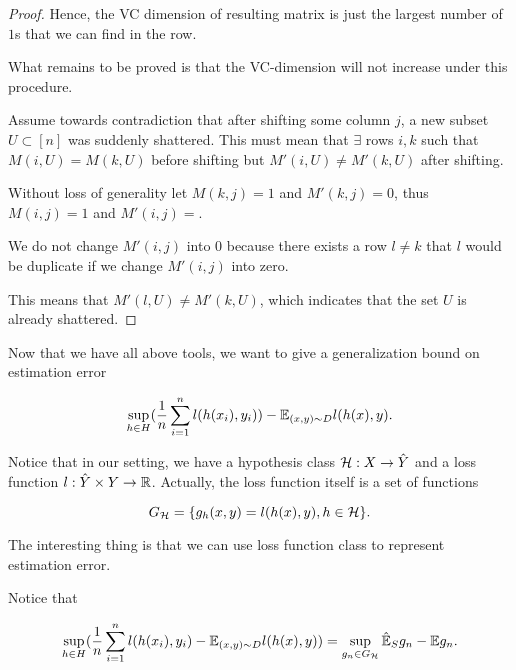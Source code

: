 \documentclass[../main.tex]{subfiles}
\begin{document}
\begin{proof}
		Hence, the VC dimension of resulting matrix is just the largest number of $1$s that we can find in the row.
		
		What remains to be proved is that the VC-dimension will not increase under this procedure.
		
		Assume towards contradiction that after shifting some column $j$, a new subset $U\subset [n]$ was suddenly shattered. This must mean that $\exists$ rows $i,k$ such that $M(i,U) = M(k,U)$ before shifting but $M'(i,U) \neq M'(k,U)$ after shifting.
		
		Without loss of generality let $M(k,j) = 1$ and $M'(k,j) = 0$, thus $M(i,j) = 1$ and $M'(i,j) = $.
		
		We do not change $M'(i,j)$ into $0$ because there exists a row $l\neq k$ that $l$ would be duplicate if we change $M'(i,j)$ into zero. 
		
		This means that $M'(l, U) \neq M'(k,U)$, which indicates that the set $U$ is already shattered.
		

		\end{proof}
		
		 Now that we have all above tools, we want to give a generalization bound on estimation error 
		 
		 \begin{equation*}
		 		 \sup\limits_{h\in H}(\frac{1}{n} \sum\limits_{i=1}^n l(h(x_i),y_i)) - \mathbb{E}_{(x,y)\sim D} l(h(x),y).
		 \end{equation*}
		 
		 Notice that in our setting, we have a hypothesis class $\mathcal{H}: X \to \hat{Y}$ and a loss function $l: \hat{Y} \times Y \to \mathbb{R}$. Actually, the loss function itself is a set of functions 
		 
		 \begin{equation*}
		 	G_{\mathcal{H}} = \{g_h(x,y) = l(h(x),y), h\in \mathcal{H}\}.
		 \end{equation*}
		
		 The interesting thing is that we can use loss function class to represent estimation error.
		 
		 Notice that 
		 
		 \begin{equation*}
		 \begin{aligned}
		  \sup\limits_{h\in H}(\frac{1}{n} \sum\limits_{i=1}^n l(h(x_i),y_i) - \mathbb{E}_{(x,y)\sim D} l(h(x),y)) = \sup\limits_{g_n \in G_{\mathcal{H}}} \hat{\mathbb{E}}_S g_n - \mathbb{E} g_n.
 		 \end{aligned}
		 \end{equation*}
		 
\end{document}
